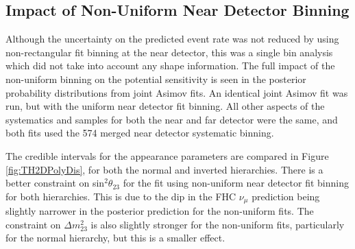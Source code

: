 \subsection{Impact of Non-Uniform Near Detector Binning}\label{sec:jointpoly}

Although the uncertainty on the predicted \SK event rate was not reduced by using non-rectangular fit binning at the near detector, this was a single bin analysis which did not take into account any shape information. The full impact of the non-uniform binning on the potential sensitivity is seen in the posterior probability distributions from joint Asimov fits. An identical joint Asimov fit was run, but with the uniform near detector fit binning. All other aspects of the systematics and samples for both the near and far detector were the same, and both fits used the 574 merged near detector systematic binning.

The credible intervals for the appearance parameters are compared in Figure \ref{fig:TH2DPolyDis}, for both the normal and inverted hierarchies. There is a better constraint on sin$^{2}\theta_{23}$ for the fit using non-uniform near detector fit binning for both hierarchies. This is due to the dip in the FHC $\nu_{\mu}$ prediction being slightly narrower in the posterior prediction for the non-uniform fits. The constraint on $\Delta m_{23}^{2}$ is also slightly stronger for the non-uniform fits, particularly for the normal hierarchy, but this is a smaller effect.

